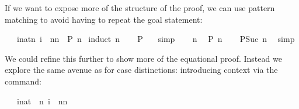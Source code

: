 \begin{isabellebody}
\begin{isamarkuptext}
If we want to expose more of the structure of the
proof, we can use pattern matching to avoid having to repeat the goal
statement:%
\end{isamarkuptext}%
\isamarkuptrue%
\isamarkupfalse%
\ {}{}\ {}\ {}{}i{}{}nat{}n{}\ i{}\ {}\ n{}{}n{}{}{}{}\ {}\ {}{}P\ n{}{}\isanewline
%
\isadelimproof
%
\endisadelimproof
%
\isatagproof
{}\isamarkupfalse%
\ {}induct\ n{}\isanewline
\ \ \isamarkupfalse%
\ {}{}P\ {}{}\ \isamarkupfalse%
\ simp\isanewline
{}\isamarkupfalse%
\isanewline
\ \ \isamarkupfalse%
\ n\ \isamarkupfalse%
\ {}{}P\ n{}\isanewline
\ \ \isamarkupfalse%
\ {}{}P{}Suc\ n{}{}\ \isamarkupfalse%
\ simp\isanewline
{}\isamarkupfalse%
%
\endisatagproof
{\isafoldproof}%
%
\isadelimproof
%
\endisadelimproof
%
\begin{isamarkuptext}%
\noindent We could refine this further to show more of the equational
proof. Instead we explore the same avenue as for case distinctions:
introducing context via the  command:%
\end{isamarkuptext}%
\isamarkuptrue%
\isamarkupfalse%
\ {}{}\ {}\ {}{}i{}{}nat\ {}\ n{}\ i{}\ {}\ n{}{}n{}{}{}{}\isanewline

\end{isabellebody}
